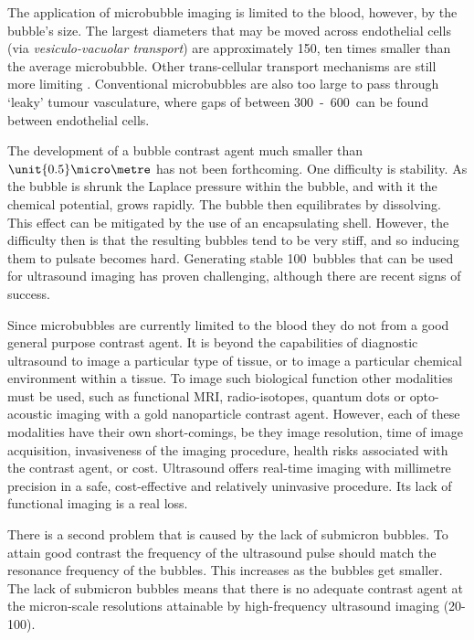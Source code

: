 The application of microbubble imaging is limited to the blood, however, by the bubble's size.
The largest diameters  that may be  moved across endothelial cells (via {\em vesiculo-vacuolar transport}) are approximately \unit{150}\nano\metre\cite{Hobbs1998},
ten times smaller than the average microbubble.
Other trans-cellular transport mechanisms are still more limiting .
Conventional microbubbles are also too large to pass through `leaky' tumour vasculature, where gaps of between \unit{300-600}\nano\metre\ can be found between endothelial 
cells\cite{Fukumori2006, Hashizume2000,  Hobbs1998}.


The development of a bubble contrast agent much smaller than $\unit{0.5}\micro\metre$ has not been forthcoming.
One difficulty is stability.
As the bubble is shrunk the  Laplace pressure within the bubble, and with it the chemical potential, 
grows rapidly.
The bubble then equilibrates  by dissolving.
This effect can be mitigated by the use of an encapsulating shell\cite{Ferrara2007}.
However, the difficulty then is that the resulting bubbles tend to be very stiff, 
and so inducing them to pulsate becomes hard\cite{Zhanwen2010,Borkent2007}.
Generating stable \unit{100}\nano\metre\  bubbles that can be used for ultrasound imaging has proven challenging,
although there are recent signs of success\cite{Zhanwen2010}.

Since microbubbles are currently limited to the blood 
they do not from a good general purpose contrast agent.
It is beyond the capabilities of diagnostic ultrasound
to image a particular type of tissue,
or to image a particular chemical environment within a tissue.
To image such biological function other modalities must be used,
such as  
functional MRI\cite{},
radio-isotopes\cite{},
quantum dots\cite{} or
opto-acoustic imaging with a gold nanoparticle contrast agent\cite{}.
However, each of these modalities have their own short-comings,
be they image resolution, time of image acquisition, 
invasiveness of the imaging procedure, 
health risks associated with the contrast agent,
or cost.
Ultrasound offers real-time imaging with millimetre precision
in a safe, cost-effective and relatively uninvasive procedure.
Its lack of functional imaging is a real loss.

There is a second problem that is caused by the lack of submicron bubbles.
To attain good contrast the frequency of the ultrasound pulse should match
the resonance frequency of the bubbles.
This increases as the bubbles get smaller\cite{}.
The lack of submicron bubbles means that there is no adequate contrast agent at the micron-scale resolutions attainable by high-frequency ultrasound imaging (20-\unit{100}\mega\hertz).

